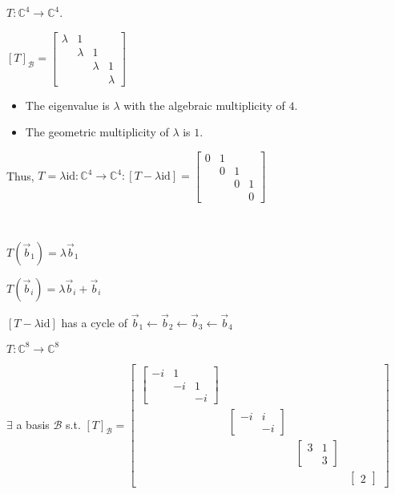 \documentclass[11pt,fleqn]{book}
\begin{document}
    \begin{example}
        $T: \mathbb{C}^4 \to \mathbb{C}^4$. 
        
        $[T]_\mathcal{B} = \begin{bmatrix} \lambda &1 \\ &\lambda &1 \\ & &\lambda &1 \\ & & &\lambda \end{bmatrix}$
        
        \begin{itemize}
            \item The eigenvalue is $\lambda$ with the algebraic multiplicity of $4$. 
            \item The geometric multiplicity of $\lambda$ is $1$. 
        \end{itemize}
        
        Thus, $T = \lambda \mathrm{id}: \mathbb{C}^4 \to \mathbb{C}^4: $$[T - \lambda \mathrm{id}] = \begin{bmatrix} 0 &1 \\ &0 &1 \\ & &0 &1 \\ & & &0 \end{bmatrix}$
        
        {~~~}
        
        $T(\vec{b}_1) = \lambda\vec{b}_1$
        
        $T(\vec{b}_i) = \lambda\vec{b}_i + \vec{b}_i$
        
        $[T - \lambda \mathrm{id}]$ has a cycle of $\vec{b}_1 \leftarrow \vec{b}_2 \leftarrow \vec{b}_3 \leftarrow \vec{b}_4$
    \end{example}
    
    \begin{example}
        $T: \mathbb{C}^8 \to \mathbb{C}^8$
        
        $\exists$ a basis $\mathcal{B}$ s.t. $[T]_\mathcal{B} = \begin{bmatrix} \begin{bmatrix} -i &1 \\ &-i &1 \\ & &-i \end{bmatrix} \\ &\begin{bmatrix} -i &i \\ &-i \end{bmatrix} \\ & &\begin{bmatrix} 3 &1 \\ &3 \end{bmatrix} \\ & && \begin{bmatrix} 2 \end{bmatrix} \end{bmatrix}$
    \end{example}
    
\end{document}
